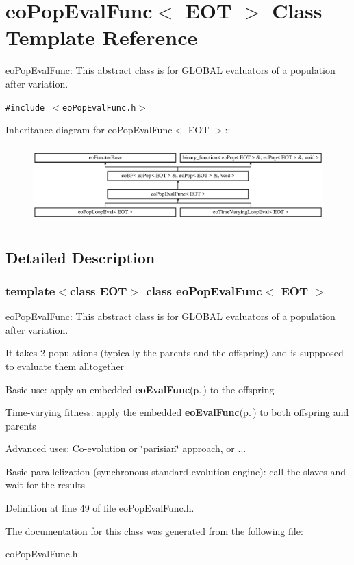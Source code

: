 \section{eo\-Pop\-Eval\-Func$<$ EOT $>$ Class Template Reference}
\label{classeo_pop_eval_func}
eo\-Pop\-Eval\-Func: This abstract class is for GLOBAL evaluators of a population after variation.  


{\tt \#include $<$eo\-Pop\-Eval\-Func.h$>$}

Inheritance diagram for eo\-Pop\-Eval\-Func$<$ EOT $>$::\begin{figure}[H]
\begin{center}
\leavevmode
\includegraphics[height=3.01075cm]{classeo_pop_eval_func}
\end{center}
\end{figure}


\subsection{Detailed Description}
\subsubsection*{template$<$class EOT$>$ class eo\-Pop\-Eval\-Func$<$ EOT $>$}

eo\-Pop\-Eval\-Func: This abstract class is for GLOBAL evaluators of a population after variation. 

It takes 2 populations (typically the parents and the offspring) and is suppposed to evaluate them alltogether

Basic use: apply an embedded {\bf eo\-Eval\-Func}{\rm (p.\,\pageref{classeo_eval_func})} to the offspring

Time-varying fitness: apply the embedded {\bf eo\-Eval\-Func}{\rm (p.\,\pageref{classeo_eval_func})} to both offspring and parents

Advanced uses: Co-evolution or \char`\"{}parisian\char`\"{} approach, or ...

Basic parallelization (synchronous standard evolution engine): call the slaves and wait for the results 



Definition at line 49 of file eo\-Pop\-Eval\-Func.h.

The documentation for this class was generated from the following file:\begin{CompactItemize}
\item 
eo\-Pop\-Eval\-Func.h\end{CompactItemize}
